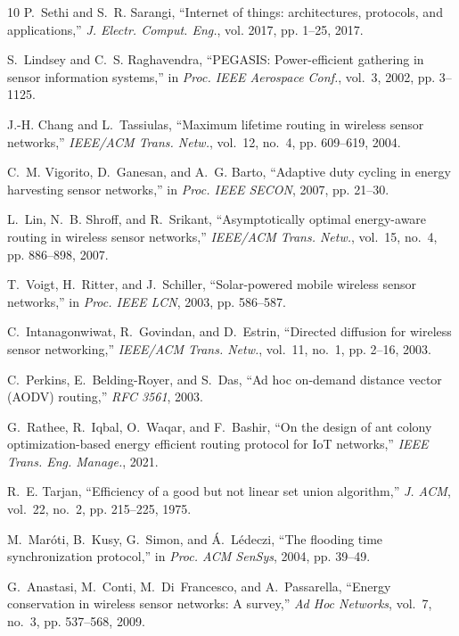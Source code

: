 \documentclass[journal]{IEEEtran}
\begin{document}
\begin{thebibliography}{10}
P.~Sethi and S.~R. Sarangi, ``Internet of things: architectures, protocols, and applications,'' \emph{J. Electr. Comput. Eng.}, vol. 2017, pp. 1--25, 2017.

S.~Lindsey and C.~S. Raghavendra, ``PEGASIS: Power-efficient gathering in sensor information systems,'' in \emph{Proc. IEEE Aerospace Conf.}, vol.~3, 2002, pp. 3--1125.

J.-H. Chang and L.~Tassiulas, ``Maximum lifetime routing in wireless sensor networks,'' \emph{IEEE/ACM Trans. Netw.}, vol.~12, no.~4, pp. 609--619, 2004.

C.~M. Vigorito, D.~Ganesan, and A.~G. Barto, ``Adaptive duty cycling in energy harvesting sensor networks,'' in \emph{Proc. IEEE SECON}, 2007, pp. 21--30.

L.~Lin, N.~B. Shroff, and R.~Srikant, ``Asymptotically optimal energy-aware routing in wireless sensor networks,'' \emph{IEEE/ACM Trans. Netw.}, vol.~15, no.~4, pp. 886--898, 2007.

T.~Voigt, H.~Ritter, and J.~Schiller, ``Solar-powered mobile wireless sensor networks,'' in \emph{Proc. IEEE LCN}, 2003, pp. 586--587.

C.~Intanagonwiwat, R.~Govindan, and D.~Estrin, ``Directed diffusion for wireless sensor networking,'' \emph{IEEE/ACM Trans. Netw.}, vol.~11, no.~1, pp. 2--16, 2003.

C.~Perkins, E.~Belding-Royer, and S.~Das, ``Ad hoc on-demand distance vector (AODV) routing,'' \emph{RFC 3561}, 2003.

G.~Rathee, R.~Iqbal, O.~Waqar, and F.~Bashir, ``On the design of ant colony optimization-based energy efficient routing protocol for IoT networks,'' \emph{IEEE Trans. Eng. Manage.}, 2021.

R.~E. Tarjan, ``Efficiency of a good but not linear set union algorithm,'' \emph{J. ACM}, vol.~22, no.~2, pp. 215--225, 1975.

M.~Mar{\'o}ti, B.~Kusy, G.~Simon, and {\'A}.~L{\'e}deczi, ``The flooding time synchronization protocol,'' in \emph{Proc. ACM SenSys}, 2004, pp. 39--49.

G.~Anastasi, M.~Conti, M.~Di~Francesco, and A.~Passarella, ``Energy conservation in wireless sensor networks: A survey,'' \emph{Ad Hoc Networks}, vol.~7, no.~3, pp. 537--568, 2009.


\end{thebibliography}
\end{document}
